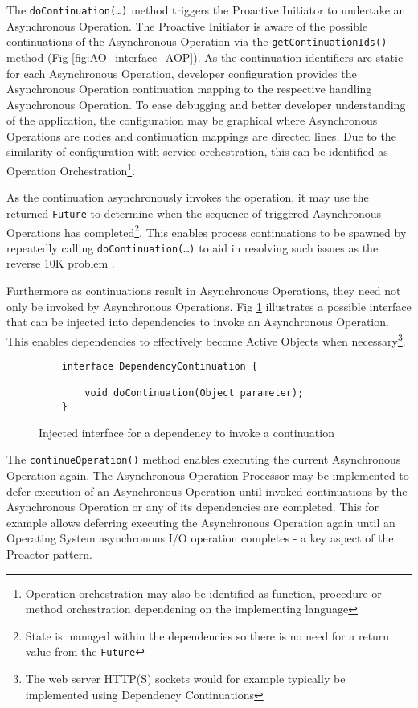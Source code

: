 \documentclass[prodmode]{style/acmlarge}
\begin{document}
The \texttt{doContinuation(\ldots)} method triggers the Proactive Initiator to
undertake an Asynchronous Operation.  The Proactive Initiator is aware of the
possible continuations of the Asynchronous Operation via the
\texttt{getContinuationIds()} method (Fig \ref{fig:AO_interface_AOP}).  As the
continuation identifiers are static for each Asynchronous Operation, developer
configuration provides the Asynchronous Operation continuation mapping to the
respective handling Asynchronous Operation.  To ease debugging and better
developer understanding of the application, the configuration may be graphical
where Asynchronous Operations are nodes and continuation mappings are directed
lines.  Due to the similarity of configuration with service orchestration, this
can be identified as Operation Orchestration\footnote{Operation orchestration
may also be identified as function, procedure or method orchestration
dependening on the implementing language}.

As the continuation asynchronously invokes the operation, it may use the
returned \texttt{Future} to determine when the sequence of triggered
Asynchronous Operations has completed\footnote{State is managed within the
dependencies so there is no need for a return value from the \texttt{Future}}.
This enables process continuations \cite{process-continuation} to be spawned by
repeatedly calling \texttt{doContinuation(\ldots)} to aid in resolving such issues
as the reverse 10K problem \cite{reverse-ten-k-problem}.

Furthermore as continuations result in Asynchronous Operations, they need not
only be invoked by Asynchronous Operations. Fig \ref{fig:DC_interface}
illustrates a possible interface that can be injected into dependencies to
invoke an Asynchronous Operation.  This enables dependencies to effectively
become Active Objects \cite{active-object} when necessary\footnote{The web
server HTTP(S) sockets would for example typically be implemented using
Dependency Continuations}.

\begin{figure}[tp]
\begin{verbatim}
    interface DependencyContinuation {
            
        void doContinuation(Object parameter);
    }
\end{verbatim}
\caption{Injected interface for a dependency to invoke a continuation}
\label{fig:DC_interface}
\end{figure}

The \texttt{continueOperation()} method enables executing the current
Asynchronous Operation again.  The Asynchronous Operation Processor may be
implemented to defer execution of an Asynchronous Operation until invoked
continuations by the Asynchronous Operation or any of its dependencies are
completed.  This for example allows deferring executing the Asynchronous
Operation again until an Operating System asynchronous I/O operation completes -
a key aspect of the Proactor pattern.
\end{document}
